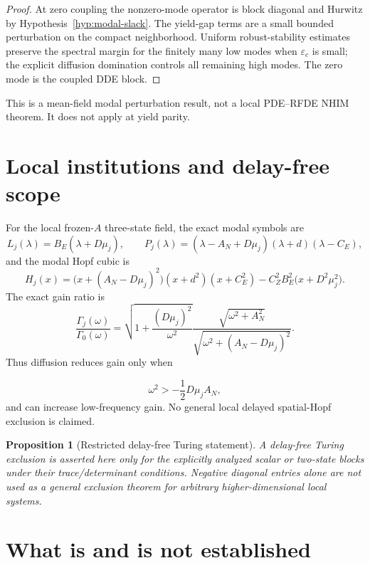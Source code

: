 \documentclass[11pt]{article}
\newtheorem{proposition}{Proposition}
\theoremstyle{definition}
\begin{document}
\begin{proof}
At zero coupling the nonzero-mode operator is block diagonal and Hurwitz by Hypothesis~\ref{hyp:modal-slack}. The yield-gap terms are a small bounded perturbation on the compact neighborhood. Uniform robust-stability estimates preserve the spectral margin for the finitely many low modes when $\varepsilon_c$ is small; the explicit diffusion domination controls all remaining high modes. The zero mode is the coupled DDE block.\end{proof}

This is a mean-field modal perturbation result, not a local PDE–RFDE NHIM theorem. It does not apply at yield parity.

\section{Local institutions and delay-free scope}
\label{sec:local}

For the local frozen-$A$ three-state field, the exact modal symbols are
\[
L_j(\lambda)=B_E(\lambda+D\mu_j),
\qquad
P_j(\lambda)=(\lambda-A_N+D\mu_j)(\lambda+d)(\lambda-C_E),
\]
and the modal Hopf cubic is
\begin{equation}
H_j(x)=\bigl(x+(A_N-D\mu_j)^2\bigr)(x+d^2)(x+C_E^2)-C_Z^2B_E^2\bigl(x+D^2\mu_j^2\bigr).
\label{eq:Hj}
\end{equation}
The exact gain ratio is
\begin{equation}
\frac{\Gamma_j(\omega)}{\Gamma_0(\omega)}
=\sqrt{1+\frac{(D\mu_j)^2}{\omega^2}}
\frac{\sqrt{\omega^2+A_N^2}}
{\sqrt{\omega^2+(A_N-D\mu_j)^2}}.
\label{eq:gain}
\end{equation}
Thus diffusion reduces gain only when

\[
\omega^2>-\frac12D\mu_jA_N,
\]
and can increase low-frequency gain. No general local delayed spatial-Hopf exclusion is claimed.

\begin{proposition}[Restricted delay-free Turing statement]
A delay-free Turing exclusion is asserted here only for the explicitly analyzed scalar or two-state blocks under their trace/determinant conditions. Negative diagonal entries alone are not used as a general exclusion theorem for arbitrary higher-dimensional local systems.
\end{proposition}

\section{What is and is not established}
\label{sec:status}
\end{document}
